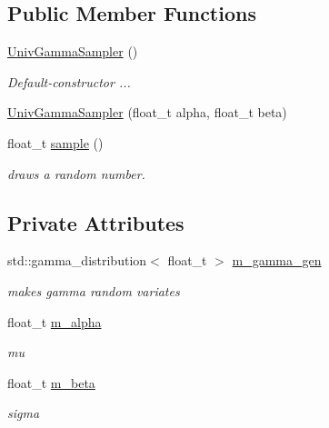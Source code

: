 \subsection*{Public Member Functions}
\begin{DoxyCompactItemize}
\item 
\mbox{\label{classrvsamp_1_1UnivGammaSampler_a3a59e3cb3c0ba0f178b1be66744fc657}} 
\hyperlink{classrvsamp_1_1UnivGammaSampler_a3a59e3cb3c0ba0f178b1be66744fc657}{Univ\+Gamma\+Sampler} ()
\begin{DoxyCompactList}\small\item\em Default-\/constructor ... \end{DoxyCompactList}\item 
\hyperlink{classrvsamp_1_1UnivGammaSampler_a5d3f04ff5b9df2418a22b30d286cfecd}{Univ\+Gamma\+Sampler} (float\+\_\+t alpha, float\+\_\+t beta)
\item 
float\+\_\+t \hyperlink{classrvsamp_1_1UnivGammaSampler_ace3479f5d5dca28f56e9953057a92e74}{sample} ()
\begin{DoxyCompactList}\small\item\em draws a random number. \end{DoxyCompactList}\end{DoxyCompactItemize}
\subsection*{Private Attributes}
\begin{DoxyCompactItemize}
\item 
\mbox{\label{classrvsamp_1_1UnivGammaSampler_a73076a58565d1f623ce06eb9c8df10e9}} 
std\+::gamma\+\_\+distribution$<$ float\+\_\+t $>$ \hyperlink{classrvsamp_1_1UnivGammaSampler_a73076a58565d1f623ce06eb9c8df10e9}{m\+\_\+gamma\+\_\+gen}
\begin{DoxyCompactList}\small\item\em makes gamma random variates \end{DoxyCompactList}\item 
\mbox{\label{classrvsamp_1_1UnivGammaSampler_a4f1af00822ee4a5b147cac9c060003d2}} 
float\+\_\+t \hyperlink{classrvsamp_1_1UnivGammaSampler_a4f1af00822ee4a5b147cac9c060003d2}{m\+\_\+alpha}
\begin{DoxyCompactList}\small\item\em mu \end{DoxyCompactList}\item 
\mbox{\label{classrvsamp_1_1UnivGammaSampler_a49864a19195b8c52a9dafe26b222add3}} 
float\+\_\+t \hyperlink{classrvsamp_1_1UnivGammaSampler_a49864a19195b8c52a9dafe26b222add3}{m\+\_\+beta}
\begin{DoxyCompactList}\small\item\em sigma \end{DoxyCompactList}\end{DoxyCompactItemize}
